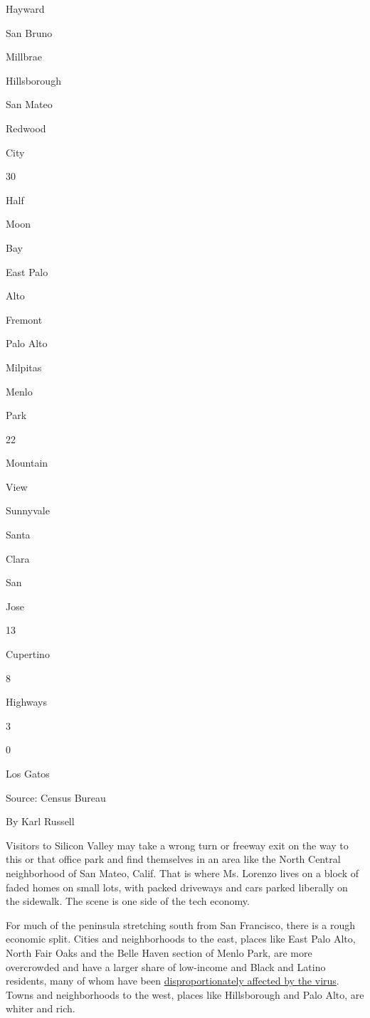 Hayward

San Bruno

Millbrae

Hillsborough

San Mateo

Redwood

City

30

Half

Moon

Bay

East Palo

Alto

Fremont

Palo Alto

Milpitas

Menlo

Park

22

Mountain

View

Sunnyvale

Santa

Clara

San

Jose

13

Cupertino

8

Highways

3

0

Los Gatos

Source: Census Bureau

By Karl Russell

Visitors to Silicon Valley may take a wrong turn or freeway exit on the
way to this or that office park and find themselves in an area like the
North Central neighborhood of San Mateo, Calif. That is where Ms.
Lorenzo lives on a block of faded homes on small lots, with packed
driveways and cars parked liberally on the sidewalk. The scene is one
side of the tech economy.

For much of the peninsula stretching south from San Francisco, there is
a rough economic split. Cities and neighborhoods to the east, places
like East Palo Alto, North Fair Oaks and the Belle Haven section of
Menlo Park, are more overcrowded and have a larger share of low-income
and Black and Latino residents, many of whom have been
\href{https://www.nytimes3xbfgragh.onion/interactive/2020/07/05/us/coronavirus-latinos-african-americans-cdc-data.html}{disproportionately
affected by the virus}. Towns and neighborhoods to the west, places like
Hillsborough and Palo Alto, are whiter and rich.

